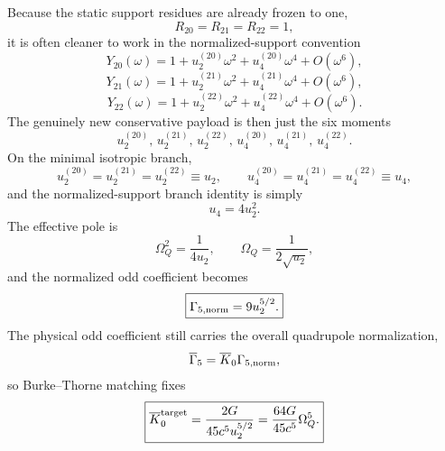 \documentclass[11pt]{article}
\begin{document}
Because the static support residues are already frozen to one,
\[
R_{20}=R_{21}=R_{22}=1,
\]
it is often cleaner to work in the normalized-support convention
\[
Y_{20}(\omega)=1+u_2^{(20)}\omega^2+u_4^{(20)}\omega^4+O(\omega^6),
\]
\[
Y_{21}(\omega)=1+u_2^{(21)}\omega^2+u_4^{(21)}\omega^4+O(\omega^6),
\]
\[
Y_{22}(\omega)=1+u_2^{(22)}\omega^2+u_4^{(22)}\omega^4+O(\omega^6).
\]
The genuinely new conservative payload is then just the six moments
\[
\boxed{
u_2^{(20)},\,u_2^{(21)},\,u_2^{(22)},\,u_4^{(20)},\,u_4^{(21)},\,u_4^{(22)}.}
\]
On the minimal isotropic branch,
\[
u_2^{(20)}=u_2^{(21)}=u_2^{(22)}\equiv u_2,
\qquad
u_4^{(20)}=u_4^{(21)}=u_4^{(22)}\equiv u_4,
\]
and the normalized-support branch identity is simply
\begin{equation}
\boxed{
u_4=4u_2^2.}
\label{eq:qnorm-normalized-branch-identity}
\end{equation}
The effective pole is
\[
\Omega_Q^2=\frac{1}{4u_2},
\qquad
\Omega_Q=\frac{1}{2\sqrt{u_2}},
\]
and the normalized odd coefficient becomes
\begin{equation}
\boxed{\Gamma_{5,\rm norm}=9u_2^{5/2}.}
\label{eq:qnorm-normalized-gamma}
\end{equation}
The physical odd coefficient still carries the overall quadrupole
normalization,
\[
\overline\Gamma_5=\overline K_0\Gamma_{5,\rm norm},
\]
so Burke--Thorne matching fixes
\begin{equation}
\boxed{
\overline K_0^{\rm target}=\frac{2G}{45c^5u_2^{5/2}}
=
\frac{64G}{45c^5}\Omega_Q^5.
}
\label{eq:qnorm-normalized-target}
\end{equation}
\end{document}
